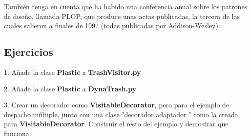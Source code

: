 También tenga en cuenta que ha habido una conferencia anual sobre los patrones de diseño, llamada PLOP, que produce unas actas publicadas, la tercera de las cuales salieron a finales de 1997 (todas publicadas por Addison-Wesley).   \newline

\subsection*{Ejercicios}
\label{subsec:Ejercicios14}


1. Añade la clase \textbf{Plastic} a \textbf{TrashVisitor.py}   \newline

2. Añade la clase \textbf{Plastic} a \textbf{DynaTrash.py}   \newline

3. Crear un decorador como \textbf{VisitableDecorator}, pero para el ejemplo de despacho múltiple, junto con una clase "decorador adaptador " como la creada para \textbf{VisitableDecorator}. Construir el resto del ejemplo y demostrar que funciona. \newline
